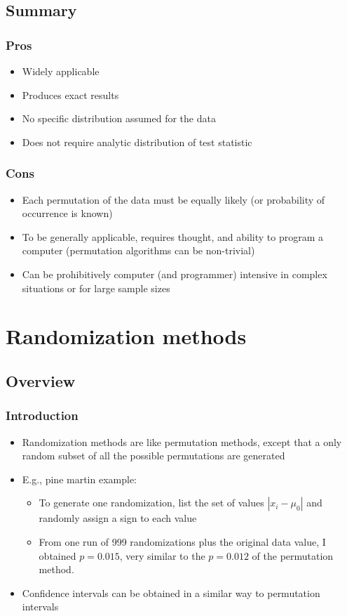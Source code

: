 \documentclass[ignorenonframetext]{beamer} %
\newcommand{\bi}{\begin{itemize}}
\newcommand{\ei}{\end{itemize}}
\begin{document}
\subsection{Summary}

\begin{frame}
	\frametitle{Pros}
	\bi
		\item Widely applicable
		\item Produces exact results
		\item No specific distribution assumed for the data
		\item Does not require analytic distribution of test statistic
	\ei
\end{frame}

\begin{frame}
	\frametitle{Cons}
	\bi
		\item Each permutation of the data must be equally likely (or probability of occurrence is known)
		\item To be generally applicable, requires thought, and ability to program a computer (permutation algorithms
		      can be non-trivial)
		\item Can be prohibitively computer (and programmer) intensive in complex situations or for large sample sizes
	\ei
\end{frame}

\section{Randomization methods}

\subsection{Overview}

\begin{frame}
	\frametitle{Introduction}
	\bi
		\item Randomization methods are like permutation methods, except that a only random subset of all the possible permutations are generated
		\item E.g., pine martin example:
		\bi
			\item To generate one randomization, list the set of values $|x_i - \mu_0|$ and randomly assign a sign to each value
			\item From one run of 999 randomizations plus the original data value, I obtained $p=0.015$, very similar to the $p=0.012$ of the permutation method.
		\ei 
		\item Confidence intervals can be obtained in a similar way to permutation intervals
	\ei
\end{frame}
\end{document}
